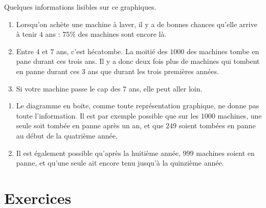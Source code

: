 \begin{example}
    Quelques informations lisibles sur ce graphiques.
    \begin{enumerate}
        \item
            Lorsqu'on achète une machine à laver, il y a de bonnes chances qu'elle arrive à tenir \( 4\) ans : \( 75\%\) des machines sont encore là.
        \item
            Entre \( 4\) et \( 7\) ans, c'est hécatombe. La moitié des \( 1000\) des machines tombe en pane durant ces trois ans. Il y a donc deux fois plus de machines qui tombent en panne durant ces 3 ans que durant les trois premières années.
        \item
            Si votre machine passe le cap des \( 7\) ans, elle peut aller loin.
    \end{enumerate}

    \begin{remark}
        \begin{enumerate}
            \item
                Le diagramme en boite, comme toute représentation graphique, ne donne pas toute l'information. Il est par exemple possible que sur les \( 1000\) machines, une seule soit tombée en panne après un an, et que $249$ soient tombées en panne au début de la quatrième année.
            \item
                Il est également possible qu'après la huitième année, \( 999\) machines soient en panne, et qu'une seule ait encore tenu jusqu'à la quinzième année.
        \end{enumerate}
    \end{remark}
\end{example}


\section{Exercices}

